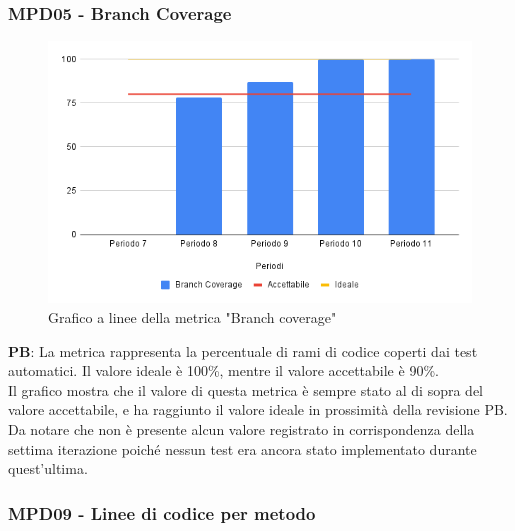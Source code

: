 \documentclass[10pt]{article}
\begin{document}
\begin{justify}
\subsubsection{MPD05 - Branch Coverage}

\begin{figure}[H]
  \centering
  \includegraphics[width=0.9\linewidth]{BranchCoverage.png}
  \caption{Grafico a linee della metrica "Branch coverage"}
\end{figure}

\textbf{PB}: La metrica rappresenta la percentuale di rami di codice coperti dai test automatici. Il valore ideale è 100\%, mentre il valore accettabile è 90\%.\\
Il grafico mostra che il valore di questa metrica è sempre stato al di sopra del valore accettabile, e ha raggiunto il valore ideale in prossimità della revisione PB.\\
Da notare che non è presente alcun valore registrato in corrispondenza della settima iterazione poiché nessun test era ancora stato implementato durante quest'ultima.\\


\subsubsection{MPD09 - Linee di codice per metodo}


\end{justify}
\end{document}
